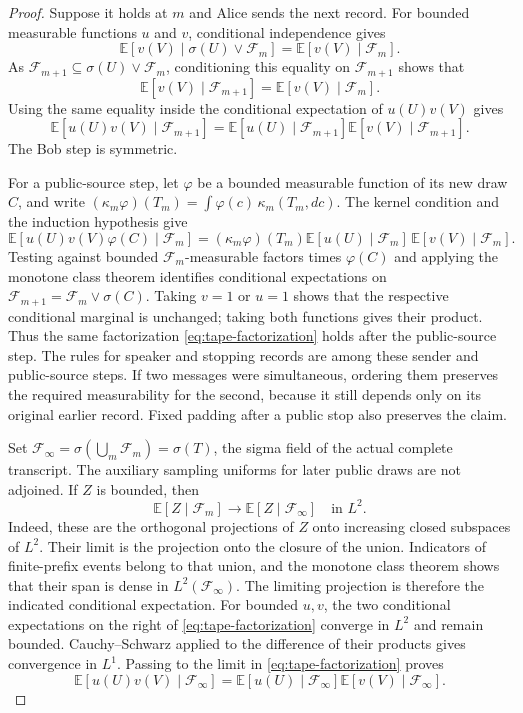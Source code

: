 \begin{proof}
Suppose it holds at $m$ and Alice sends the next record.  For bounded
measurable functions $u$ and $v$, conditional independence gives
\[
 \mathbb E[v(V)\mid\sigma(U)\vee\mathcal F_m]
 =\mathbb E[v(V)\mid\mathcal F_m].
\]
As $\mathcal F_{m+1}\subseteq\sigma(U)\vee\mathcal F_m$, conditioning
this equality on $\mathcal F_{m+1}$ shows that
\[
 \mathbb E[v(V)\mid\mathcal F_{m+1}]
 =\mathbb E[v(V)\mid\mathcal F_m].
\]
Using the same equality inside the conditional expectation of
$u(U)v(V)$ gives
\begin{equation}\label{eq:tape-factorization}
 \mathbb E[u(U)v(V)\mid\mathcal F_{m+1}]
 =\mathbb E[u(U)\mid\mathcal F_{m+1}]
  \mathbb E[v(V)\mid\mathcal F_{m+1}].
\end{equation}
The Bob step is symmetric.

For a public-source step, let $\varphi$ be a bounded measurable function
of its new draw $C$, and write
$(\kappa_m\varphi)(T_m)=\int\varphi(c)\,\kappa_m(T_m,dc)$.  The kernel
condition and the induction hypothesis give
\[
 \mathbb E[u(U)v(V)\varphi(C)\mid\mathcal F_m]
 =(\kappa_m\varphi)(T_m)
   \mathbb E[u(U)\mid\mathcal F_m]\,
   \mathbb E[v(V)\mid\mathcal F_m].
\]
Testing against bounded $\mathcal F_m$-measurable factors times
$\varphi(C)$ and applying the monotone class theorem identifies conditional expectations on
$\mathcal F_{m+1}=\mathcal F_m\vee\sigma(C)$.  Taking $v=1$ or $u=1$
shows that the respective conditional marginal is unchanged; taking
both functions gives their product.  Thus the same factorization
\eqref{eq:tape-factorization} holds after the public-source step.
The rules for speaker and stopping records are among these sender and
public-source steps.  If two messages were simultaneous, ordering them
preserves the required measurability for the second, because it still
depends only on its original earlier record.  Fixed padding after a
public stop also preserves the claim.

Set $\mathcal F_\infty=\sigma(\bigcup_m\mathcal F_m)=\sigma(T)$, the sigma
field of the actual complete transcript.  The auxiliary sampling uniforms
for later public draws are not adjoined.  If $Z$ is bounded, then
\[
 \mathbb E[Z\mid\mathcal F_m]\longrightarrow
 \mathbb E[Z\mid\mathcal F_\infty]\quad\text{in }L^2.
\]
Indeed, these are the orthogonal projections of $Z$ onto increasing
closed subspaces of $L^2$.  Their limit is the projection onto the
closure of the union.  Indicators of finite-prefix events belong to
that union, and the monotone class theorem shows that their span is
dense in $L^2(\mathcal F_\infty)$.  The limiting projection is therefore
the indicated conditional expectation.  For bounded $u,v$, the two
conditional expectations on the right of \eqref{eq:tape-factorization}
converge in $L^2$ and remain bounded.  Cauchy--Schwarz applied to the
difference of their products gives convergence in $L^1$.  Passing to
the limit in \eqref{eq:tape-factorization} proves
\[
 \mathbb E[u(U)v(V)\mid\mathcal F_\infty]
 =\mathbb E[u(U)\mid\mathcal F_\infty]
  \mathbb E[v(V)\mid\mathcal F_\infty].
\]


\end{proof}
